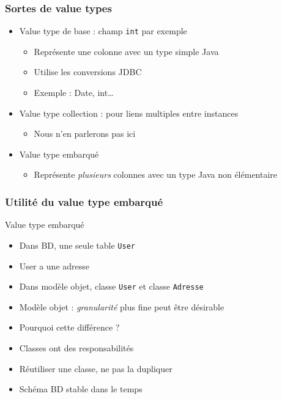 \documentclass[english, french]{beamer}
\begin{document}
\begin{frame}
	\frametitle{Sortes de value types}
	\begin{itemize}
		\item Value type de base : champ \texttt{int} par exemple
		\begin{itemize}
			\item Représente une colonne avec un type simple Java
			\item Utilise les conversions JDBC
			\item Exemple : Date, int…
		\end{itemize}
		\item Value type collection : pour liens multiples entre instances
		\begin{itemize}
			\item Nous n’en parlerons pas ici
		\end{itemize}
		\item Value type embarqué
		\begin{itemize}
			\item Représente \emph{plusieurs} colonnes avec un type Java non élémentaire
		\end{itemize}
	\end{itemize}
\end{frame}

\begin{frame}
	\frametitle{Utilité du value type embarqué}
	\begin{exampleblock}{Value type embarqué}
		\begin{itemize}
			\item Dans BD, une seule table \texttt{User}
			\item User a une adresse
			\item Dans modèle objet, classe \texttt{User} et classe \texttt{Adresse}
		\end{itemize}
	\end{exampleblock}
	\begin{itemize}
		\item Modèle objet : \emph{granularité} plus fine peut être désirable
		\item Pourquoi cette différence ? \pause
		\item Classes ont des responsabilités
		\item Réutiliser une classe, ne pas la dupliquer
		\item Schéma BD stable dans le temps
	\end{itemize}
\end{frame}
\end{document}
